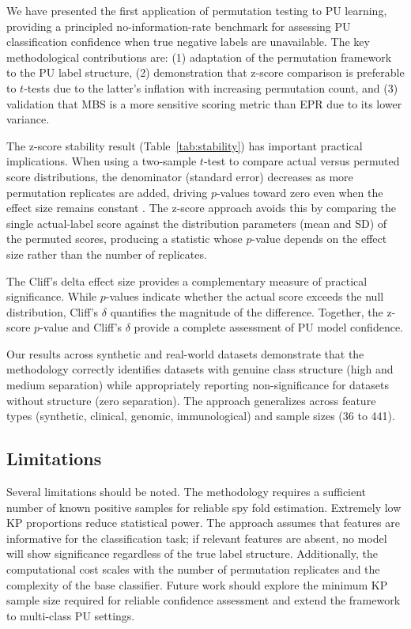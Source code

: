 \documentclass[11pt]{article}
\begin{document}
We have presented the first application of permutation testing to PU learning, providing a principled no-information-rate benchmark for assessing PU classification confidence when true negative labels are unavailable. The key methodological contributions are: (1) adaptation of the permutation framework to the PU label structure, (2) demonstration that z-score comparison is preferable to $t$-tests due to the latter's inflation with increasing permutation count, and (3) validation that MBS is a more sensitive scoring metric than EPR due to its lower variance.

The z-score stability result (Table~\ref{tab:stability}) has important practical implications. When using a two-sample $t$-test to compare actual versus permuted score distributions, the denominator (standard error) decreases as more permutation replicates are added, driving $p$-values toward zero even when the effect size remains constant \citep{good2005}. The z-score approach avoids this by comparing the single actual-label score against the distribution parameters (mean and SD) of the permuted scores, producing a statistic whose $p$-value depends on the effect size rather than the number of replicates.

The Cliff's delta effect size \citep{cliff1993} provides a complementary measure of practical significance. While $p$-values indicate whether the actual score exceeds the null distribution, Cliff's $\delta$ quantifies the magnitude of the difference. Together, the z-score $p$-value and Cliff's $\delta$ provide a complete assessment of PU model confidence.

Our results across synthetic and real-world datasets demonstrate that the methodology correctly identifies datasets with genuine class structure (high and medium separation) while appropriately reporting non-significance for datasets without structure (zero separation). The approach generalizes across feature types (synthetic, clinical, genomic, immunological) and sample sizes (36 to 441).

\subsection{Limitations}

Several limitations should be noted. The methodology requires a sufficient number of known positive samples for reliable spy fold estimation. Extremely low KP proportions reduce statistical power. The approach assumes that features are informative for the classification task; if relevant features are absent, no model will show significance regardless of the true label structure. Additionally, the computational cost scales with the number of permutation replicates and the complexity of the base classifier. Future work should explore the minimum KP sample size required for reliable confidence assessment and extend the framework to multi-class PU settings.
\end{document}
